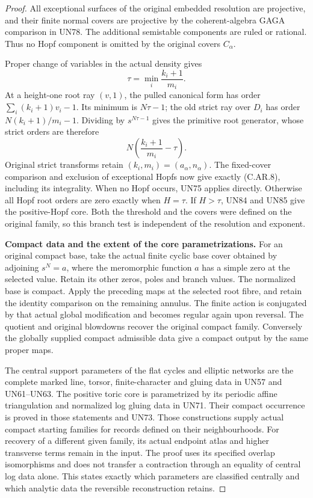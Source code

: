 \begin{proof}
All exceptional surfaces of the original
embedded resolution are projective, and
their finite normal covers are projective
by the coherent-algebra GAGA comparison
in UN78. The additional semistable
components are ruled or rational.
Thus no Hopf component is omitted by
the original covers \(C_\alpha\).

Proper change of variables in the actual
density gives
\[
                   \tau=\min_i\frac{k_i+1}{m_i}.
 \tag{C.AR.15}
\]
At a height-one root ray \((v,1)\),
the pulled canonical form has order
\(\sum_i(k_i+1)v_i-1\). Its minimum
is \(N\tau-1\); the old strict ray
over \(D_i\) has order
\(N(k_i+1)/m_i-1\). Dividing by
\(s^{N\tau-1}\) gives the primitive
root generator, whose strict orders
are therefore
\[
                  N\left(\frac{k_i+1}{m_i}-\tau\right).
 \tag{C.AR.16}
\]
Original strict transforms retain
\((k_i,m_i)=(a_\alpha,n_\alpha)\).
The fixed-cover comparison and exclusion
of exceptional Hopfs now give exactly
(C.AR.8), including its integrality.
When no Hopf occurs, UN75 applies
directly. Otherwise all Hopf root
orders are zero exactly when
\(H=\tau\). If \(H>\tau\), UN84
and UN85 give the positive-Hopf core.
Both the threshold and the covers
were defined on the original family,
so this branch test is independent
of the resolution and exponent.

\par\medskip\noindent\textbf{Compact data and the extent of the core parametrizations.}
For an original compact base, take the
actual finite cyclic base cover obtained
by adjoining \(s^N=a\), where the
meromorphic function \(a\) has a simple
zero at the selected value. Retain its
other zeros, poles and branch values.
The normalized base is compact. Apply
the preceding maps at the selected
root fibre, and retain the identity
comparison on the remaining annulus.
The finite action is conjugated by
that actual global modification and
becomes regular again upon reversal.
The quotient and original blowdowns
recover the original compact family.
Conversely the globally supplied
compact admissible data give a compact
output by the same proper maps.

The central support parameters of the
flat cycles and elliptic networks are
the complete marked line, torsor,
finite-character and gluing data in
UN57 and UN61--UN63. The positive
toric core is parametrized by its
periodic affine triangulation and
normalized log gluing data in UN71.
Their compact occurrence is proved
in those statements and UN73.
Those constructions supply actual
compact starting families for records
defined on their neighbourhoods.
For recovery of a different given
family, its actual endpoint atlas
and higher transverse terms remain
in the input. The proof uses its
specified overlap isomorphisms and
does not transfer a contraction
through an equality of central log
data alone. This states exactly
which parameters are classified
centrally and which analytic data
the reversible reconstruction retains.
\end{proof}
